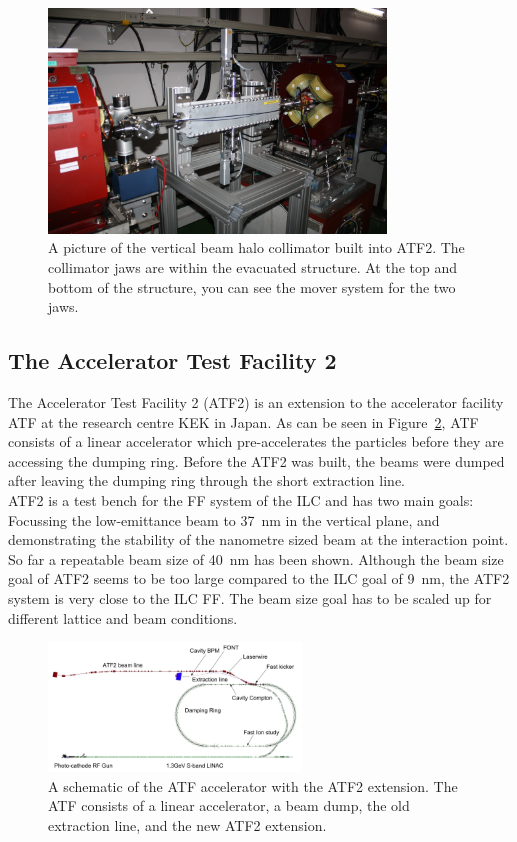 \begin{figure}
\centering
\includegraphics[width=0.8\textwidth]{Figures/Installed_Collimator.jpg}
\caption[Picture of the installed beam halo collimator]{A picture of the vertical beam halo collimator built into ATF2. The collimator jaws are within the evacuated structure. At the top and bottom of the structure, you can see the mover system for the two jaws.}
\label{fig:installed_collimator}
\end{figure}

\subsection{The Accelerator Test Facility 2}
\label{ATF2}

The Accelerator Test Facility 2 (ATF2) is an extension to the accelerator facility ATF at the research centre KEK in Japan. As can be seen in Figure~\ref{fig:ATF}, ATF consists of a linear accelerator which pre-accelerates the particles before they are accessing the dumping ring. Before the ATF2 was built, the beams were dumped after leaving the dumping ring through the short extraction line.\\ATF2 is a test bench for the FF system of the ILC and has two main goals: Focussing the low-emittance beam to \SI{37}{\nano\metre} in the vertical plane, and demonstrating the stability of the nanometre sized beam at the interaction point. So far a repeatable beam size of \SI{40}{\nano\metre} has been shown. Although the beam size goal of ATF2 seems to be too large compared to the ILC goal of \SI{9}{\nano\metre}, the ATF2 system is very close to the ILC FF. The beam size goal has to be scaled up for different lattice and beam conditions.

\begin{figure}
\centering
\includegraphics[width=0.6\textwidth]{Figures/ATF.jpg}
\caption[ATF accelerator]{A schematic of the ATF accelerator with the ATF2 extension. The ATF consists of a linear accelerator, a beam dump, the old extraction line, and the new ATF2 extension.}%
\label{fig:ATF}
\end{figure}

